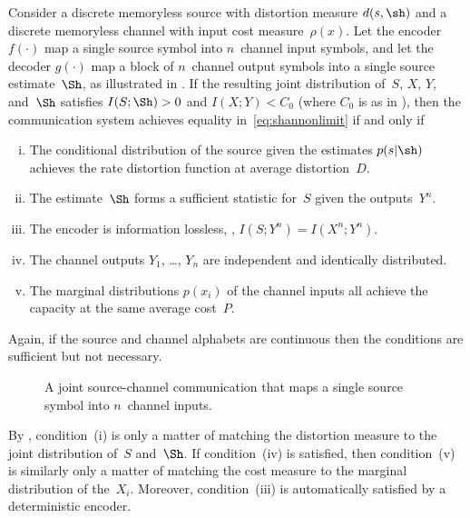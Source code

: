 \begin{theorem}
  \label{thm:tcntc1n}
  Consider a discrete memoryless source with distortion measure $d(s,\sh)$  and
  a discrete memoryless channel with input cost measure~$\rho(x)$. Let the
  encoder $f(\cdot)$ map a single source symbol into $n$~channel input symbols,
  and let the decoder $g(\cdot)$ map a block of $n$~channel output symbols into
  a single source estimate~$\Sh$, as illustrated in .  If the
  resulting joint distribution of~$S$, $X$, $Y$, and~$\Sh$ satisfies $I(S;\Sh) >
  0$ and $I(X;Y) < C_0$ (where $C_0$ is as in ), then the
  communication system achieves equality in~\eqref{eq:shannonlimit} if and only
  if
  \begin{enumerate}[(i)]
    \item The conditional distribution of the source given the estimates
      $p(s|\sh)$ achieves the rate distortion function at average
      distortion~$D$.

    \item The estimate~$\Sh$ forms a sufficient statistic for~$S$ given the
      outputs~$Y^n$.

    \item The encoder is information lossless, \ie,  $I(S; Y^n) = I(X^n; Y^n)$. 

    \item The channel outputs $Y_1$, \ldots, $Y_n$ are independent and
      identically distributed.

    \item The marginal distributions $p(x_i)$ of the channel inputs all achieve
      the capacity at the same average cost~$P$.
  \end{enumerate}
  Again, if the source and channel alphabets are continuous then the conditions
  are sufficient but not necessary.
\end{theorem}

\begin{figure}
  \begin{center}
    
  \end{center}
  \caption{A joint source-channel communication that maps a single source symbol
  into $n$~channel inputs.}
  \label{fig:scgen}
\end{figure}

\begin{discussion}
  By , condition~(i) is only a matter of matching the
  distortion measure to the joint distribution of~$S$ and~$\Sh$. If
  condition~(iv) is satisfied, then condition~(v) is similarly only a matter of
  matching the cost measure to the marginal distribution of the~$X_i$. Moreover,
  condition~(iii) is automatically satisfied by a deterministic encoder.
\end{discussion}

